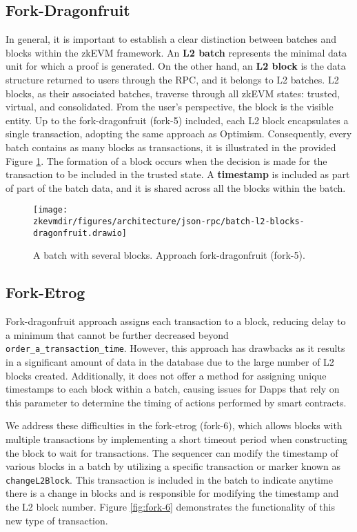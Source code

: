 \subsection{Fork-Dragonfruit}

In general, it is important to establish a clear distinction between batches and blocks within the zkEVM framework. An \textbf{L2 batch} represents the minimal data unit for which a proof is generated. On the other hand, an \textbf{L2 block} is the data structure returned to users through the RPC, and it belongs to L2 batches. L2 blocks, as their associated batches, traverse through all zkEVM states: trusted, virtual, and consolidated. From the user's perspective, the block is the visible entity. Up to the fork-dragonfruit (fork-5) included, each L2 block encapsulates a single transaction, adopting the same approach as Optimism. Consequently, every batch contains as many blocks as transactions, it is illustrated in the provided Figure \ref{fig:fork-5}. The formation of a block occurs when the decision is made for the transaction to be included in the trusted state. A \textbf{timestamp} is included as part of part of the batch data, and it is shared across all the blocks within the batch.


\begin{figure}[H]
\centering
\texttt{[image: \\zkevmdir/figures/architecture/json-rpc/batch-l2-blocks-dragonfruit.drawio]}
\caption{A batch with several blocks. Approach fork-dragonfruit (fork-5).}
\label{fig:fork-5}
\end{figure}

\subsection{Fork-Etrog}

Fork-dragonfruit approach assigns each transaction to a block, reducing delay to a minimum that cannot be further decreased beyond \texttt{order\_a\_transaction\_time}. However, this approach has drawbacks as it results in a significant amount of data in the database due to the large number of L2 blocks created. Additionally, it does not offer a method for assigning unique timestamps to each block within a batch, causing issues for Dapps that rely on this parameter to determine the timing of actions performed by smart contracts.

We address these difficulties in the fork-etrog (fork-6), which allows blocks with multiple transactions by implementing a short timeout period when constructing the block to wait for transactions. The sequencer can modify the timestamp of various blocks in a batch by utilizing a specific transaction or marker known as \texttt{changeL2Block}. This transaction is included in the batch to indicate anytime there is a change in blocks and is responsible for modifying the timestamp and the L2 block number. Figure \ref{fig:fork-6} demonstrates the functionality of this new type of transaction.

